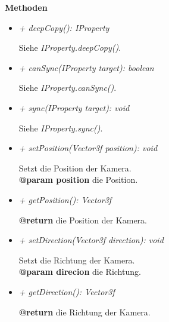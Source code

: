             \textbf{Methoden}
            \begin{itemize}
                \item \textit{+ deepCopy(): IProperty}
                    \begin{leftbar}[0.9\linewidth]
                        Siehe \textit{IProperty.deepCopy()}.
                    \end{leftbar}
                \item \textit{+ canSync(IProperty target): boolean}
                    \begin{leftbar}[0.9\linewidth]
                        Siehe \textit{IProperty.canSync()}.
                    \end{leftbar}
                \item \textit{+ sync(IProperty target): void}
                    \begin{leftbar}[0.9\linewidth]
                        Siehe \textit{IProperty.sync()}.
                    \end{leftbar}
                \item \textit{+ setPosition(Vector3f position): void}
                    \begin{leftbar}[0.9\linewidth]
                        Setzt die Position der Kamera.\\
                        \textbf{@param position} die Position.
                    \end{leftbar}
                \item \textit{+ getPosition(): Vector3f}
                    \begin{leftbar}[0.9\linewidth]
                        \textbf{@return} die Position der Kamera.
                    \end{leftbar}
                \item \textit{+ setDirection(Vector3f direction): void}
                    \begin{leftbar}[0.9\linewidth]
                        Setzt die Richtung der Kamera.\\
                        \textbf{@param direcion} die Richtung.
                    \end{leftbar}
                \item \textit{+ getDirection(): Vector3f}
                    \begin{leftbar}[0.9\linewidth]
                        \textbf{@return} die Richtung der Kamera.
                    \end{leftbar}

\end{itemize}
